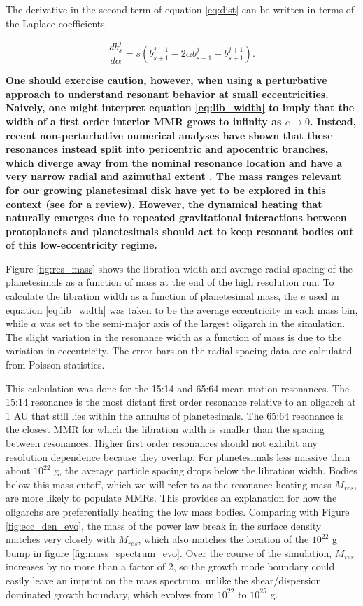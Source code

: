\noindent The derivative in the second term of equation \ref{eq:dist} can be written in terms of the Laplace coefficients 
\cite{murray00}

\begin{equation}\label{eq:lap_d}
\frac{d b_{s}^{j}}{d \alpha} = s \left( b_{s+1}^{j-1} - 2 \alpha b_{s+1}^{j} + b_{s+1}^{j+1} \right).
\end{equation}

\textbf{One should exercise caution, however, when using a perturbative approach to understand resonant behavior at small eccentricities. Naively, one might interpret equation \ref{eq:lib_width} to imply that the width of a first order interior MMR grows to infinity as $e \to 0$. Instead, recent non-perturbative numerical analyses have shown that these resonances instead split into pericentric and apocentric branches, which diverge away from the nominal resonance location and have a very narrow radial and azimuthal extent \cite{malhotra23}. The mass ranges relevant for our growing planetesimal disk have yet to be explored in this context (see \cite{malhotra22} for a review). However, the dynamical heating that naturally emerges due to repeated gravitational interactions between protoplanets and planetesimals should act to keep resonant bodies out of this low-eccentricity regime.}

Figure \ref{fig:res_mass} shows the libration width and average radial spacing of the planetesimals as a function of mass at the 
end of the high resolution run. To calculate the libration width as a function of planetesimal mass, the $e$ used in equation 
\ref{eq:lib_width} was taken to be the average eccentricity in each mass bin, while $a$ was set to the semi-major axis of the 
largest oligarch in the simulation. The slight variation in the resonance width as a function of mass is due to the variation in 
eccentricity. The error bars on the radial spacing data are calculated from Poisson statistics.

This calculation was done for the 15:14 and 65:64 mean motion resonances. The 15:14 resonance is the most distant first order 
resonance relative to an oligarch at 1 AU that still lies within the annulus of planetesimals. The 65:64 resonance is the closest 
MMR for which the libration width is smaller than the spacing between resonances. Higher first order resonances should not 
exhibit any resolution dependence because they overlap. For planetesimals less massive than about $10^{22}$ g, the average 
particle spacing drops below the libration width. Bodies below this mass cutoff, which we will refer to as the resonance heating 
mass $M_{res}$, are more likely to populate MMRs. This provides an explanation for how the oligarchs are preferentially heating 
the low mass bodies. Comparing with Figure \ref{fig:ecc_den_evo}, the mass of the power law break in the surface density 
matches very closely with $M_{res}$, which also matches the location of the $10^{22}$ g bump in figure 
\ref{fig:mass_spectrum_evo}. Over the course of the simulation, $M_{res}$ increases by no more than a factor of 2, so the 
growth mode boundary could easily leave an imprint on the mass spectrum, unlike the shear/dispersion dominated growth 
boundary, which evolves from $10^{22}$ to $10^{25}$ g.

